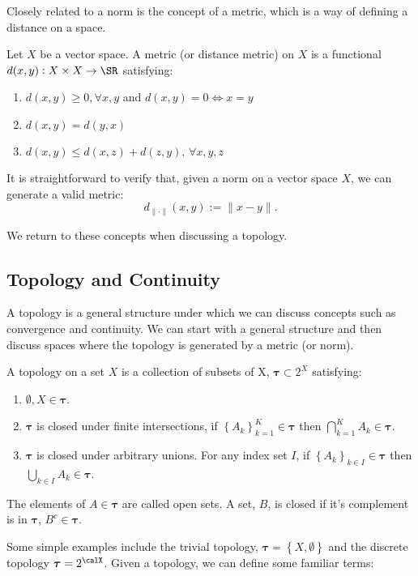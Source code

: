 Closely related to a norm is the concept of a metric, which is a way of defining a distance on a space. 
\begin{definition}[Metric]
	\label{def:metric}
	Let \(X\) be a vector space. A metric (or distance metric) on \(X\) is a functional  \(d(x,y): X \times X \to \SR\) satisfying:
	 \begin{enumerate}
		 \item \(d(x,y)\geq 0,\forall x,y\) and \(d(x,y) = 0 \iff x = y\)
		 \item \(d(x,y) = d(y,x)\)
		 \item \(d(x,y) \leq d(x,z) + d(z,y),\,\forall x,y,z\)
	\end{enumerate}
\end{definition}

It is straightforward to verify that, given a norm on a vector space \(X\), we can generate a valid metric:
 \[
	 d_{\|\cdot\|}(x,y) := \|x-y\|
.\]

We return to these concepts when discussing a topology. 

\subsection{Topology and Continuity}%
\label{subsec:topology}

A topology is a general structure under which we can discuss concepts such as convergence and continuity. We can start with a general structure and then discuss spaces where the topology is generated by a metric (or norm).

\begin{definition}[Topology]
	\label{def:topology}
	A topology on a set \(X\) is a collection of subsets of X, \(\boldsymbol{\tau} \subset 2^X\) satisfying:
	\begin{enumerate}
		\item \(\emptyset, X \in \boldsymbol{\tau}\).
		\item \(\boldsymbol{\tau}\) is closed under finite intersections, if \(\left\{A_k\right\}_{k=1}^K \in \boldsymbol{\tau}\) then \(\bigcap_{k=1}^K A_k \in \boldsymbol{\tau}\).
		\item \(\boldsymbol{\tau}\) is closed under arbitrary unions. For any index set \(I\), if \(\left\{A_k\right\}_{k\in I} \in \boldsymbol{\tau}\) then \(\bigcup_{k\in I} A_k \in \boldsymbol{\tau}\).
	\end{enumerate}
	The elements of \(A\in\boldsymbol\tau\) are called open sets. A set, \(B\), is closed if it's complement is in \(\boldsymbol{\tau}\), \(B^c \in \boldsymbol{\tau}\).
\end{definition}
Some simple examples include the trivial topology, \(\boldsymbol{\tau} = \left\{X, \emptyset\right\}\) and the discrete topology  \(\boldsymbol{\tau} = 2^\calX\). Given a topology, we can define some familiar terms:

